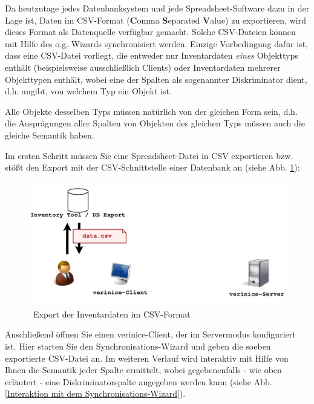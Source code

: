 \documentclass[a4paper,10pt]{book}
\begin{document}
Da heutzutage jedes Datenbanksystem und jede Spreadsheet-Software dazu in der
Lage ist, Daten im CSV-Format (\textbf{C}omma \textbf{S}eparated \textbf{V}alue)
zu exportieren, wird dieses Format als Datenquelle verfügbar gemacht. Solche
CSV-Dateien können mit Hilfe des o.g. Wizards synchronisiert werden. Einzige
Vorbedingung dafür ist, dass eine CSV-Datei vorliegt, die entweder nur
Inventardaten \textit{eines} Objekttyps enthält (beispielsweise ausschließlich
Clients) oder Inventardaten mehrerer Objekttypen enthält, wobei eine der Spalten
als sogenannter Diskriminator dient, d.h. angibt, von welchem Typ ein Objekt
ist.

Alle Objekte desselben Typs müssen natürlich von der gleichen Form sein, d.h.
die Ausprägungen aller Spalten von Objekten des gleichen Typs müssen auch die
gleiche Semantik haben.

Im ersten Schritt müssen Sie eine Spreadsheet-Datei in CSV exportieren bzw.
stößt den Export mit der CSV-Schnittstelle einer Datenbank an (siehe Abb.
\ref{Export der Inventardaten im CSV-Format}):
\newline
\begin{figure}[htb!]
  \centering
  \includegraphics[scale=.26]{Screenshot/Use_case_verinice_wizard_01_03.png}
  \caption{\label{Export der Inventardaten im CSV-Format} \ Export der Inventardaten im CSV-Format}
\end{figure}

Anschließend öffnen Sie einen verinice-Client, der im Servermodus konfiguriert
ist. Hier starten Sie den Synchronisations-Wizard und geben die soeben
exportierte CSV-Datei an. Im weiteren Verlauf wird interaktiv mit Hilfe von
Ihnen die Semantik jeder Spalte ermittelt, wobei gegebenenfalls - wie oben
erläutert - eine Diskriminatorspalte angegeben werden kann (siehe Abb.
\ref{Interaktion mit dem Synchronisations-Wizard}).
\end{document}
